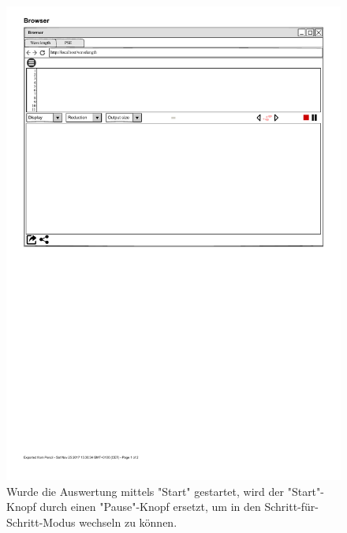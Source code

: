 \documentclass[parskip=full,11pt,twoside]{scrartcl}
\begin{document}
{\begin{figure}[H]
	\centering
	\includegraphics{img/pauseButton}
	\caption{Wurde die Auswertung mittels "Start" gestartet, wird der "Start"-Knopf durch einen "Pause"-Knopf ersetzt, um in den Schritt-für-Schritt-Modus wechseln zu können.}
\end{figure}


}
\end{document}
